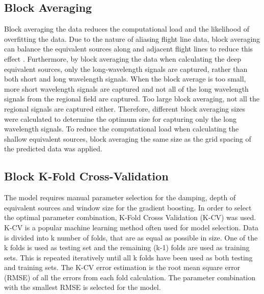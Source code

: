 \subsection{Block Averaging}
Block averaging the data reduces the computational load and the likelihood of overfitting the data. Due to the nature of aliasing flight line data, block averaging can balance the equivalent sources along and adjacent flight lines to reduce this effect \citep{SolerUieda2021}. Furthermore, by block averaging the data when calculating the deep equivalent sources, only the long-wavelength signals are captured, rather than both short and long wavelength signals. When the block average is too small, more short wavelength signals are captured and not all of the long wavelength signals from the regional field are captured. Too large block averaging, not all the regional signals are captured either. Therefore, different block averaging sizes were calculated to determine the optimum size for capturing only the long wavelength signals. To reduce the computational load when calculating the shallow equivalent sources, block averaging the same size as the grid spacing of the predicted data was applied.

\subsection{Block K-Fold Cross-Validation}
The model requires manual parameter selection for the damping, depth of equivalent sources and window size for the gradient boosting. In order to select the optimal parameter combination, K-Fold Crosss Validation (K-CV) was used. K-CV is a popular machine learning method often used for model selection. Data is divided into k number of folds, that are as equal as possible in size. One of the k folds is used as testing set and the remaining (k-1) folds are used as training sets. This is repeated iteratively until all k folds have been used as both testing and training sets. The K-CV error estimation is the root mean square error (RMSE) of all the errors from each fold calculation. The parameter combination with the smallest RMSE is selected for the model.

